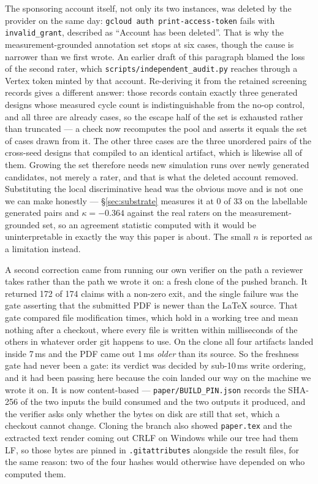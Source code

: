 \documentclass[10pt,twocolumn]{article}
\begin{document}
The sponsoring account itself, not only its two instances, was deleted by the provider on
the same day: \texttt{gcloud auth print-access-token} fails with
\texttt{invalid\_grant}, described as ``Account has been deleted''. That is why the
measurement-grounded
annotation set stops at six cases, though the cause is narrower than we first wrote. An
earlier draft of this paragraph blamed the loss of the second rater, which
\texttt{scripts/independent\_audit.py} reaches through a Vertex token minted by that
account. Re-deriving it from the retained screening records gives a different answer: those
records contain exactly three generated designs whose measured cycle count is
indistinguishable from the no-op control, and all three are already cases, so the escape
half of the set is exhausted rather than truncated --- a check now recomputes the pool and
asserts it equals the set of cases drawn from it. The other three cases are the three
unordered pairs of the cross-seed designs that compiled to an identical artifact, which is
likewise all of them. Growing the set therefore needs new simulation runs over newly
generated candidates, not merely a rater, and that is what the deleted account removed.
Substituting the local discriminative head
was the obvious move and is not one we can make honestly --- \S\ref{sec:substrate} measures
it at 0 of 33 on the labellable generated pairs and $\kappa=-0.364$ against the real
raters on the measurement-grounded set, so an agreement statistic computed with it would be
uninterpretable in exactly the way this paper is about. The small $n$ is reported as a
limitation instead.

A second correction came from running our own verifier on the path a reviewer takes
rather than the path we wrote it on: a fresh clone of the pushed branch. It returned
172 of 174 claims with a non-zero exit, and the single failure was the gate asserting
that the submitted PDF is newer than the \LaTeX{} source. That gate compared file
modification times, which hold in a working tree and mean nothing after a checkout,
where every file is written within milliseconds of the others in whatever order git
happens to use. On the clone all four artifacts landed inside 7\,ms and the PDF came
out 1\,ms \emph{older} than its source. So the freshness gate had never been a gate:
its verdict was decided by sub-10\,ms write ordering, and it had been passing here
because the coin landed our way on the machine we wrote it on. It is now content-based
--- \texttt{paper/BUILD\_PIN.json} records the SHA-256 of the two inputs the build
consumed and the two outputs it produced, and the verifier asks only whether the bytes
on disk are still that set, which a checkout cannot change. Cloning the branch also
showed \texttt{paper.tex} and the extracted text render coming out CRLF on Windows
while our tree had them LF, so those bytes are pinned in \texttt{.gitattributes}
alongside the result files, for the same reason: two of the four hashes would
otherwise have depended on who computed them.
\end{document}
